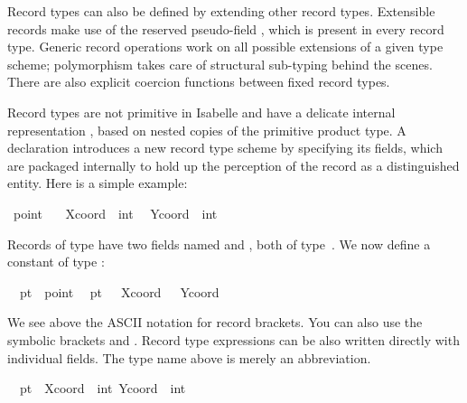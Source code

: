 \begin{isabellebody}
\begin{isamarkuptext}
  Record types can also be defined by extending other record types.
  Extensible records make use of the reserved pseudo-field ,
  which is present in every record type.  Generic record operations
  work on all possible extensions of a given type scheme; polymorphism
  takes care of structural sub-typing behind the scenes.  There are
  also explicit coercion functions between fixed record types.%
\end{isamarkuptext}%
\isamarkuptrue%
%
\isamarkuptrue%
%
\begin{isamarkuptext}%
Record types are not primitive in Isabelle and have a delicate
  internal representation \cite{NaraschewskiW-TPHOLs98}, based on
  nested copies of the primitive product type.  A 
  declaration introduces a new record type scheme by specifying its
  fields, which are packaged internally to hold up the perception of
  the record as a distinguished entity.  Here is a simple example:%
\end{isamarkuptext}%
\isamarkuptrue%
\ point\ {\isacharequal}\isanewline
\ \ Xcoord\ {\isacharcolon}{\isacharcolon}\ int\isanewline
\ \ Ycoord\ {\isacharcolon}{\isacharcolon}\ int\isamarkupfalse%
%
\begin{isamarkuptext}%
Records of type  have two fields named 
  and , both of type~.  We now define a
  constant of type :%
\end{isamarkuptext}%
\isamarkuptrue%
\isanewline
\ \ pt{}\ {\isacharcolon}{\isacharcolon}\ point\isanewline
\ \ {\isachardoublequote}pt{}\ {\isasymequiv}\ {\isacharparenleft}{\isacharbar}\ Xcoord\ {\isacharequal}\ {}{}{}{\isacharcomma}\ Ycoord\ {\isacharequal}\ {}{}\ {\isacharbar}{\isacharparenright}{\isachardoublequote}\isamarkupfalse%
%
\begin{isamarkuptext}%
We see above the ASCII notation for record brackets.  You can also
  use the symbolic brackets \isa{{\isasymlparr}} and \isa{{\isasymrparr}}.  Record type
  expressions can be also written directly with individual fields.
  The type name above is merely an abbreviation.%
\end{isamarkuptext}%
\isamarkuptrue%
\isanewline
\ \ pt{}\ {\isacharcolon}{\isacharcolon}\ {\isachardoublequote}{\isasymlparr}Xcoord\ {\isacharcolon}{\isacharcolon}\ int{\isacharcomma}\ Ycoord\ {\isacharcolon}{\isacharcolon}\ int{\isasymrparr}{\isachardoublequote}\isanewline

\end{isabellebody}

